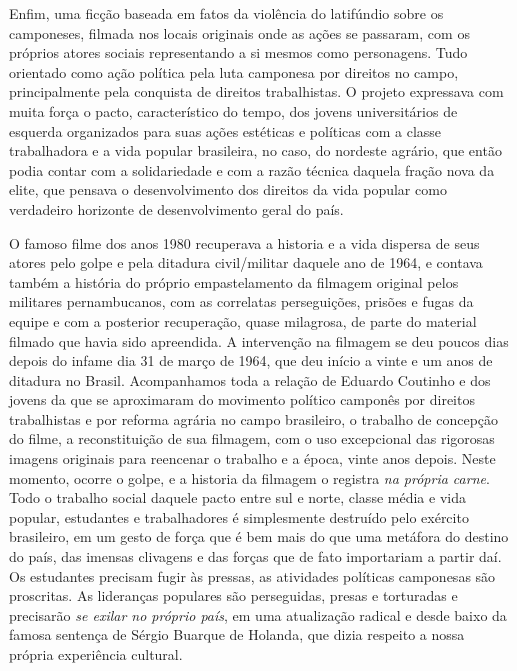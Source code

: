 Enfim, uma ficção baseada em fatos da violência do latifúndio sobre os
camponeses, filmada nos locais originais onde as ações se passaram, com
os próprios atores sociais representando a si mesmos como personagens.
Tudo orientado como ação política pela luta camponesa por direitos no
campo, principalmente pela conquista de direitos trabalhistas. O projeto
expressava com muita força o pacto, característico do tempo, dos jovens
universitários de esquerda organizados para suas ações estéticas e
políticas com a classe trabalhadora e a vida popular brasileira, no
caso, do nordeste agrário, que então podia contar com a solidariedade e
com a razão técnica daquela fração nova da elite, que pensava o
desenvolvimento dos direitos da vida popular como verdadeiro horizonte
de desenvolvimento geral do país.

O famoso filme dos anos 1980 recuperava a historia e a vida dispersa de
seus atores pelo golpe e pela ditadura civil/militar daquele ano de
1964, e contava também a história do próprio empastelamento da filmagem
original pelos militares pernambucanos, com as correlatas perseguições,
prisões e fugas da equipe e com a posterior recuperação, quase
milagrosa, de parte do material filmado que havia sido apreendida. A
intervenção na filmagem se deu poucos dias depois do infame dia 31 de
março de 1964, que deu início a vinte e um anos de ditadura no Brasil.
Acompanhamos toda a relação de Eduardo Coutinho e dos jovens da  que
se aproximaram do movimento político camponês por direitos trabalhistas
e por reforma agrária no campo brasileiro, o trabalho de concepção do
filme, a reconstituição de sua filmagem, com o uso excepcional das
rigorosas imagens originais para reencenar o trabalho e a época, vinte
anos depois. Neste momento, ocorre o golpe, e a historia da filmagem o
registra \emph{na própria carne}. Todo o trabalho social daquele pacto
entre sul e norte, classe média e vida popular, estudantes e
trabalhadores é simplesmente destruído pelo exército brasileiro, em um
gesto de força que é bem mais do que uma metáfora do destino do país,
das imensas clivagens e das forças que de fato importariam a partir daí.
Os estudantes precisam fugir às pressas, as atividades políticas
camponesas são proscritas. As lideranças populares são perseguidas,
presas e torturadas e precisarão \emph{se exilar no próprio país}, em
uma atualização radical e desde baixo da famosa sentença de Sérgio
Buarque de Holanda, que dizia respeito a nossa própria experiência
cultural.

